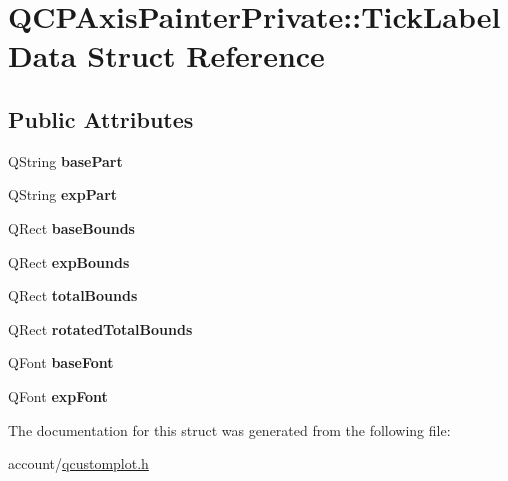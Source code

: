\hypertarget{structQCPAxisPainterPrivate_1_1TickLabelData}{\section{\-Q\-C\-P\-Axis\-Painter\-Private\-:\-:\-Tick\-Label\-Data \-Struct \-Reference}
\label{structQCPAxisPainterPrivate_1_1TickLabelData}
}
\subsection*{\-Public \-Attributes}
\begin{DoxyCompactItemize}
\item 
\hypertarget{structQCPAxisPainterPrivate_1_1TickLabelData_ad65b76a5cafc412179a20b5d79809fc4}{\-Q\-String {\bfseries base\-Part}}\label{structQCPAxisPainterPrivate_1_1TickLabelData_ad65b76a5cafc412179a20b5d79809fc4}

\item 
\hypertarget{structQCPAxisPainterPrivate_1_1TickLabelData_a09692e4ea092137278b4ac051d5fdf2b}{\-Q\-String {\bfseries exp\-Part}}\label{structQCPAxisPainterPrivate_1_1TickLabelData_a09692e4ea092137278b4ac051d5fdf2b}

\item 
\hypertarget{structQCPAxisPainterPrivate_1_1TickLabelData_aac1047ae6ab8e9f5a42923082aabfff5}{\-Q\-Rect {\bfseries base\-Bounds}}\label{structQCPAxisPainterPrivate_1_1TickLabelData_aac1047ae6ab8e9f5a42923082aabfff5}

\item 
\hypertarget{structQCPAxisPainterPrivate_1_1TickLabelData_a6722d2bcefb93011e9dc42301b966846}{\-Q\-Rect {\bfseries exp\-Bounds}}\label{structQCPAxisPainterPrivate_1_1TickLabelData_a6722d2bcefb93011e9dc42301b966846}

\item 
\hypertarget{structQCPAxisPainterPrivate_1_1TickLabelData_afbb3163cf4c628914f1b703945419ea5}{\-Q\-Rect {\bfseries total\-Bounds}}\label{structQCPAxisPainterPrivate_1_1TickLabelData_afbb3163cf4c628914f1b703945419ea5}

\item 
\hypertarget{structQCPAxisPainterPrivate_1_1TickLabelData_aa4d38c5ea47c9184a78ee33ae7f1012e}{\-Q\-Rect {\bfseries rotated\-Total\-Bounds}}\label{structQCPAxisPainterPrivate_1_1TickLabelData_aa4d38c5ea47c9184a78ee33ae7f1012e}

\item 
\hypertarget{structQCPAxisPainterPrivate_1_1TickLabelData_a0d4958a706debaa8d19a9b65fc090d56}{\-Q\-Font {\bfseries base\-Font}}\label{structQCPAxisPainterPrivate_1_1TickLabelData_a0d4958a706debaa8d19a9b65fc090d56}

\item 
\hypertarget{structQCPAxisPainterPrivate_1_1TickLabelData_adc10767ebcb719d6927c012a38b9d933}{\-Q\-Font {\bfseries exp\-Font}}\label{structQCPAxisPainterPrivate_1_1TickLabelData_adc10767ebcb719d6927c012a38b9d933}

\end{DoxyCompactItemize}


\-The documentation for this struct was generated from the following file\-:\begin{DoxyCompactItemize}
\item 
account/\hyperlink{qcustomplot_8h}{qcustomplot.\-h}\end{DoxyCompactItemize}

